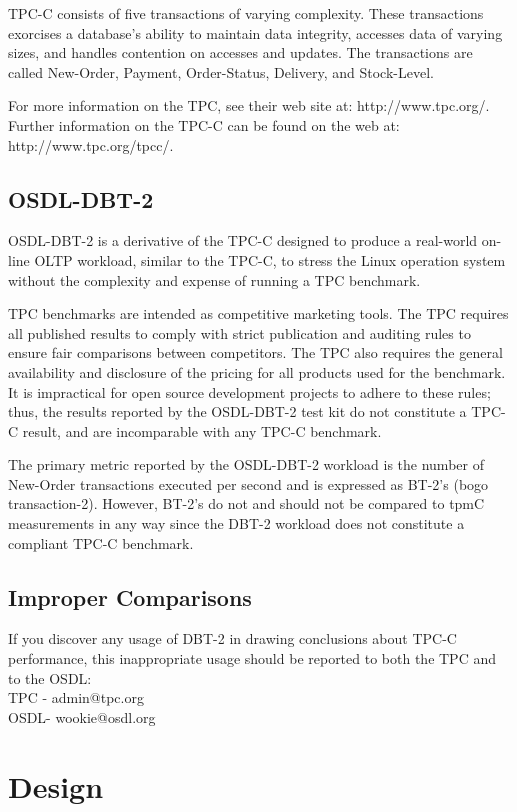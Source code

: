 \documentclass{article}
\begin{document}
TPC-C consists of five transactions of varying complexity.  These
transactions exorcises a database's ability to maintain data integrity,
accesses data of varying sizes, and handles contention on accesses and
updates.  The transactions are called New-Order, Payment, Order-Status,
Delivery, and Stock-Level.

For more information on the TPC, see their web site at: http://www.tpc.org/.
Further information on the TPC-C can be found on the web at:
http://www.tpc.org/tpcc/.

\subsection{OSDL-DBT-2}

OSDL-DBT-2 is a derivative of the TPC-C designed to produce a real-world
on-line OLTP workload, similar to the TPC-C, to stress the Linux operation
system without the complexity and expense of running a TPC benchmark.

TPC benchmarks are intended as competitive marketing tools.  The TPC requires
all published results to comply with strict publication and auditing rules to
ensure fair comparisons between competitors.  The TPC also requires the
general availability and disclosure of the pricing for all products used for
the benchmark.  It is impractical for open source development projects to
adhere to these rules; thus, the results reported by the OSDL-DBT-2 test kit
do not constitute a TPC-C result, and are incomparable with any TPC-C
benchmark.

The primary metric reported by the OSDL-DBT-2 workload is the number of
New-Order transactions executed per second and is expressed as BT-2's (bogo
transaction-2).  However, BT-2's do not and should not be compared to tpmC
measurements in any way since the DBT-2 workload does not constitute a
compliant TPC-C benchmark.

\subsection{Improper Comparisons}

If you discover any usage of DBT-2 in drawing conclusions about TPC-C
performance, this inappropriate usage should be reported to both the TPC and
to the OSDL: \\
TPC - admin@tpc.org\\
OSDL- wookie@osdl.org

\section{Design}
\end{document}
